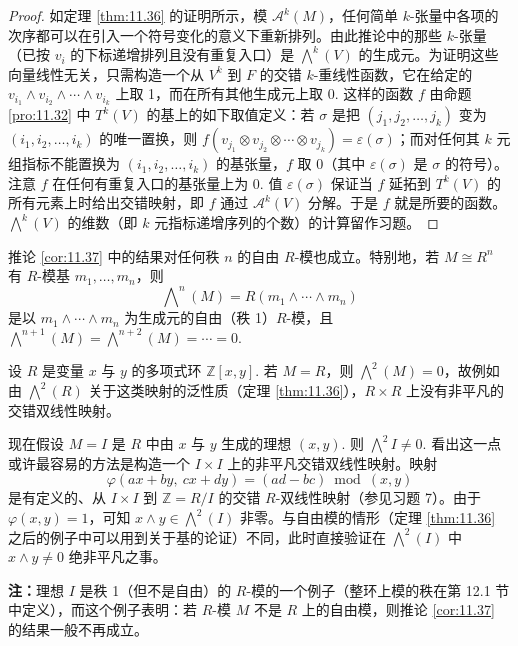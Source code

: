 \begin{proof}
如定理 \ref{thm:11.36} 的证明所示，模 \(\mathcal{A}^k(M)\)，任何简单 \(k\)-张量中各项的次序都可以在引入一个符号变化的意义下重新排列。由此推论中的那些 \(k\)-张量（已按 \(v_i\) 的下标递增排列且没有重复入口）是 \(\bigwedge^k(V)\) 的生成元。为证明这些向量线性无关，只需构造一个从 \(V^k\) 到 \(F\) 的交错 \(k\)-重线性函数，它在给定的 \(v_{i_1} \wedge v_{i_2} \wedge \cdots \wedge v_{i_k}\) 上取 1，而在所有其他生成元上取 0. 这样的函数 \(f\) 由命题 \ref{pro:11.32} 中 \(T^k(V)\) 的基上的如下取值定义：若 \(\sigma\) 是把 \((j_1, j_2, \ldots, j_k)\) 变为 \((i_1, i_2, \ldots, i_k)\) 的唯一置换，则 \(f(v_{j_1} \otimes v_{j_2} \otimes \cdots \otimes v_{j_k}) = \varepsilon(\sigma)\)；而对任何其 \(k\) 元组指标不能置换为 \((i_1, i_2, \ldots, i_k)\) 的基张量，\(f\) 取 0（其中 \(\varepsilon(\sigma)\) 是 \(\sigma\) 的符号）。注意 \(f\) 在任何有重复入口的基张量上为 0. 值 \(\varepsilon(\sigma)\) 保证当 \(f\) 延拓到 \(T^k(V)\) 的所有元素上时给出交错映射，即 \(f\) 通过 \(\mathcal{A}^k(V)\) 分解。于是 \(f\) 就是所要的函数。\(\bigwedge^k(V)\) 的维数（即 \(k\) 元指标递增序列的个数）的计算留作习题。
\end{proof}

推论 \ref{cor:11.37} 中的结果对任何秩 \(n\) 的自由 \(R\)-模也成立。特别地，若 \(M \cong R^n\) 有 \(R\)-模基 \(m_1, \ldots, m_n\)，则
\[
\bigwedge\nolimits^n(M) = R(m_1 \wedge \cdots \wedge m_n)
\]
是以 \(m_1 \wedge \cdots \wedge m_n\) 为生成元的自由（秩 1）\(R\)-模，且 \(\bigwedge^{n+1}(M) = \bigwedge^{n+2}(M) = \cdots = 0\).

\begin{example}
设 \(R\) 是变量 \(x\) 与 \(y\) 的多项式环 \(\mathbb{Z}[x, y]\). 若 \(M = R\)，则 \(\bigwedge^2(M) = 0\)，故例如由 \(\bigwedge^2(R)\) 关于这类映射的泛性质（定理 \ref{thm:11.36}），\(R \times R\) 上没有非平凡的交错双线性映射。

现在假设 \(M = I\) 是 \(R\) 中由 \(x\) 与 \(y\) 生成的理想 \((x, y)\). 则 \(\bigwedge^2 I \neq 0\). 看出这一点或许最容易的方法是构造一个 \(I \times I\) 上的非平凡交错双线性映射。映射
\[
\varphi(ax+by,\ cx+dy) = (ad-bc) \bmod (x, y)
\]
是有定义的、从 \(I \times I\) 到 \(\mathbb{Z} = R/I\) 的交错 \(R\)-双线性映射（参见习题 7）。由于 \(\varphi(x, y) = 1\)，可知 \(x \wedge y \in \bigwedge^2(I)\) 非零。与自由模的情形（定理 \ref{thm:11.36} 之后的例子中可以用到关于基的论证）不同，此时直接验证在 \(\bigwedge^2(I)\) 中 \(x \wedge y \neq 0\) 绝非平凡之事。

\noindent\textbf{注：}理想 \(I\) 是秩 1（但不是自由）的 \(R\)-模的一个例子（整环上模的秩在第 12.1 节中定义），而这个例子表明：若 \(R\)-模 \(M\) 不是 \(R\) 上的自由模，则推论 \ref{cor:11.37} 的结果一般不再成立。
\end{example}

